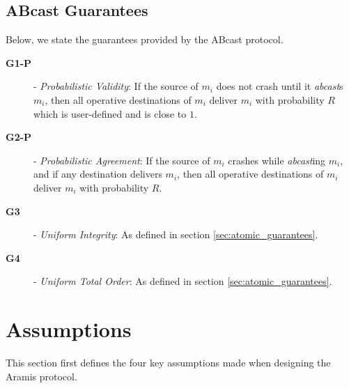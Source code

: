     \subsection{ABcast Guarantees}
    Below, we state the guarantees provided by the \textsf{ABcast} protocol.  
    
    \begin{description}
    \item [\textbf{G1-P}] - \emph{Probabilistic Validity}: If the source of $m_i$ does not crash until it \emph{abcast}s $m_i$, then all operative destinations of $m_i$ deliver $m_i$ with probability $R$ which is user-defined and is close to $1$.  
    
    \item [\textbf{G2-P}] - \emph{Probabilistic Agreement}: If the source of $m_i$ crashes while \emph{abcast}ing $m_i$, and if any destination delivers $m_i$, then all operative
destinations of $m_i$ deliver $m_i$ with probability $R$.  
    \item [\textbf{G3}] - \emph{Uniform Integrity}: As defined in section \ref{sec:atomic_guarantees}.
    \item [\textbf{G4}] - \emph{Uniform Total Order}: As defined in section \ref{sec:atomic_guarantees}.
\end{description}

\newpage
\section{Assumptions}
    This section first defines the four key assumptions made when designing the \textsf{Aramis} protocol. 

